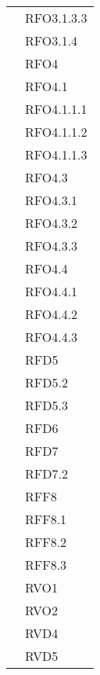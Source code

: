 \begin{center}
\begin{longtable}{ | >{\centering\arraybackslash}m{5cm} | >{\centering\arraybackslash}m{5cm} | }
            & RFO3.1.3.3 \\
            & RFO3.1.4 \\
            & RFO4 \\
            & RFO4.1 \\
            & RFO4.1.1.1 \\
            & RFO4.1.1.2 \\
            & RFO4.1.1.3 \\
            & RFO4.3 \\
            & RFO4.3.1 \\
            & RFO4.3.2 \\
            & RFO4.3.3 \\
            & RFO4.4 \\
            & RFO4.4.1 \\
            & RFO4.4.2 \\
            & RFO4.4.3 \\
            & RFD5 \\
            & RFD5.2 \\
            & RFD5.3 \\
            & RFD6 \\
            & RFD7 \\
            & RFD7.2 \\
            & RFF8 \\
            & RFF8.1 \\
            & RFF8.2 \\
            & RFF8.3 \\
            & RVO1 \\
            & RVO2 \\
            & RVD4 \\
            & RVD5 \\
\hline


\end{longtable}
\end{center}

